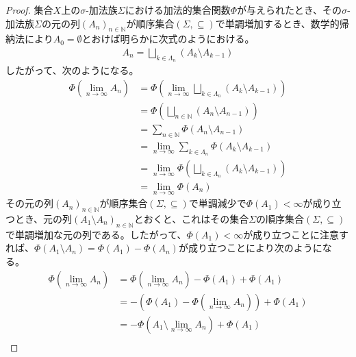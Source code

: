 \documentclass[dvipdfmx]{jsarticle}
\begin{document}
\begin{proof}
集合$X$上の$\sigma$-加法族$\varSigma$における加法的集合関数$\varPhi$が与えられたとき、その$\sigma$-加法族$\varSigma$の元の列$\left( A_{n} \right)_{n \in \mathbb{N}}$が順序集合$(\varSigma, \subseteq )$で単調増加するとき、数学的帰納法により$A_{0} = \emptyset$とおけば明らかに次式のようにおける。
\begin{align*}
A_{n} = \bigsqcup_{k \in \varLambda_{n}} \left( A_{k} \setminus A_{k - 1} \right)
\end{align*}
したがって、次のようになる。
\begin{align*}
\varPhi\left( \lim_{n \rightarrow \infty}A_{n} \right) &= \varPhi\left( \lim_{n \rightarrow \infty}{\bigsqcup_{k \in \varLambda_{n}} \left( A_{k} \setminus A_{k - 1} \right)} \right)\\
&= \varPhi\left( \bigsqcup_{n \in \mathbb{N}} \left( A_{n} \setminus A_{n - 1} \right) \right)\\
&= \sum_{n \in \mathbb{N}} {\varPhi\left( A_{n} \setminus A_{n - 1} \right)}\\
&= \lim_{n \rightarrow \infty}{\sum_{k \in \varLambda_{n}} {\varPhi\left( A_{k} \setminus A_{k - 1} \right)}}\\
&= \lim_{n \rightarrow \infty}{\varPhi\left( \bigsqcup_{k \in \varLambda_{n}} \left( A_{k} \setminus A_{k - 1} \right) \right)}\\
&= \lim_{n \rightarrow \infty}{\varPhi\left( A_{n} \right)}
\end{align*}
その元の列$\left( A_{n} \right)_{n \in \mathbb{N}}$が順序集合$(\varSigma, \subseteq )$で単調減少で$\varPhi\left( A_{1} \right) < \infty$が成り立つとき、元の列$\left( A_{1} \setminus A_{n} \right)_{n \in \mathbb{N}}$とおくと、これはその集合$\varSigma$の順序集合$(\varSigma, \subseteq )$で単調増加な元の列である。したがって、$\varPhi\left( A_{1} \right) < \infty$が成り立つことに注意すれば、$\varPhi\left( A_{1} \setminus A_{n} \right) = \varPhi\left( A_{1} \right) - \varPhi\left( A_{n} \right)$が成り立つことにより次のようになる。
\begin{align*}
\varPhi\left( \lim_{n \rightarrow \infty}A_{n} \right) &= \varPhi\left( \lim_{n \rightarrow \infty}A_{n} \right) - \varPhi\left( A_{1} \right) + \varPhi\left( A_{1} \right)\\
&= - \left( \varPhi\left( A_{1} \right) - \varPhi\left( \lim_{n \rightarrow \infty}A_{n} \right) \right) + \varPhi\left( A_{1} \right)\\
&= - \varPhi\left( A_{1} \setminus \lim_{n \rightarrow \infty}A_{n} \right) + \varPhi\left( A_{1} \right)\\

\end{align*}
\end{proof}
\end{document}
